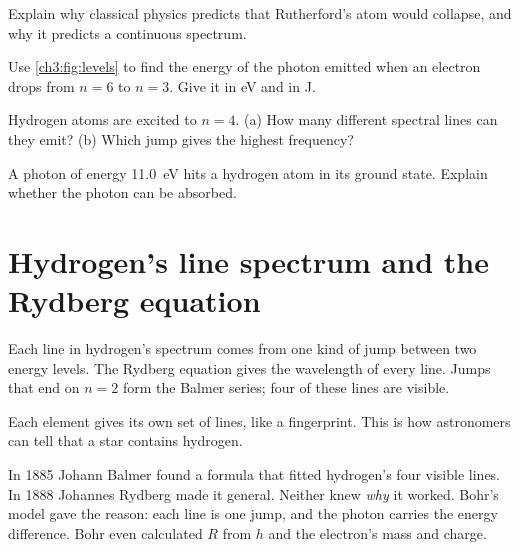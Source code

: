 \begin{quickcheck}
  \item Explain why classical physics predicts that Rutherford's atom would collapse, and why
        it predicts a continuous spectrum.
  \item Use \cref{ch3:fig:levels} to find the energy of the photon emitted when an electron
        drops from $n = 6$ to $n = 3$. Give it in eV and in J.
  \item Hydrogen atoms are excited to $n = 4$. (a) How many different spectral lines can
        they emit? (b) Which jump gives the highest frequency?
  \item A photon of energy \qty{11.0}{eV} hits a hydrogen atom in its ground state. Explain
        whether the photon can be absorbed.
\end{quickcheck}

\section{Hydrogen's line spectrum and the Rydberg equation}\label{ch3:sec:rydberg}

\begin{bigidea}
Each line in hydrogen's spectrum comes from one kind of jump between two energy levels. The
Rydberg equation gives the wavelength of every line. Jumps that end on $n = 2$ form the Balmer
series; four of these lines are visible.
\end{bigidea}

\begin{keywords}
\end{keywords}

Each element gives its own set of lines, like a fingerprint. This is how astronomers can tell
that a star contains hydrogen.

In 1885 Johann Balmer found a formula that fitted hydrogen's four visible lines. In 1888
Johannes Rydberg made it general. Neither knew \emph{why} it worked. Bohr's model gave the
reason: each line is one jump, and the photon carries the energy difference. Bohr even
calculated $R$ from $h$ and the electron's mass and charge.

